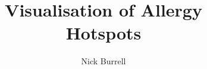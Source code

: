 \documentclass[12pt]{third-rep}
\title{Visualisation of Allergy\\
  Hotspots}
\author{Nick Burrell}
\begin{document}
\dotitleandabstract

\tableofcontents
\listoffigures
\listoftables









\end{document}

